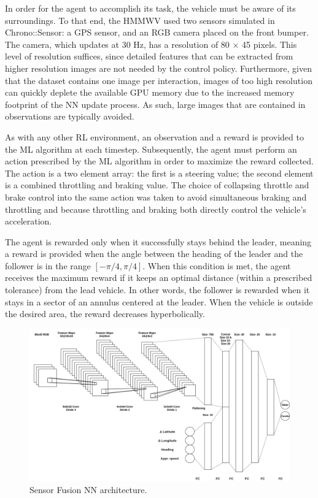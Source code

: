\documentclass[12pt,twocolumn]{article}
\begin{document}
In order for the agent to accomplish its task, the vehicle must be aware of its surroundings. To that end, the HMMWV used two sensors simulated in Chrono::Sensor: a GPS sensor, and an RGB camera placed on the front bumper. The camera, which updates at 30 Hz, has a resolution of 80 $\times$ 45 pixels. This level of resolution suffices, since detailed features that can be extracted from higher resolution images are not needed by the control policy. Furthermore, given that the dataset contains one image per interaction, images of too high resolution can quickly deplete the available GPU memory due to the increased memory footprint of the NN update process. As such, large images that are contained in observations are typically avoided. 

As with any other RL environment, an observation and a reward is provided to the ML algorithm at each timestep. Subsequently, the agent must perform an action prescribed by the ML algorithm in order to maximize the reward collected. The action is a two element array: the first is a steering value; the second element is a combined throttling and braking value. The choice of collapsing throttle and brake control into the same action was taken to avoid simultaneous braking and throttling and because throttling and braking both directly control the vehicle's acceleration. 

The agent is rewarded only when it successfully stays behind the leader, meaning a reward is provided when the angle between the heading of the leader and the follower is in the range $[-\pi/4, \pi/4]$. When this condition is met, the agent receives the maximum reward if it keeps an optimal distance (within a prescribed tolerance) from the lead vehicle. In other words, the follower is rewarded when it stays in a sector of an annulus centered at the leader. When the vehicle is outside the desired area, the reward decreases hyperbolically. 
\begin{figure}
    \centering
    \includegraphics[angle=90,width=0.6\linewidth]{Figs/MS_NN.png}
    \caption{{\small Sensor Fusion NN architecture.}}   
    \label{fig:NNarch}
\end{figure}
\end{document}
